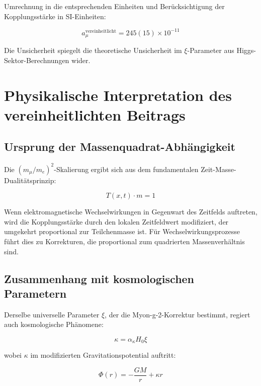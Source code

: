 \documentclass[12pt,a4paper]{article}
\newcommand{\Tfieldt}{T(x,t)}
\newcommand{\xipar}{\xi}
\begin{document}
	Umrechnung in die entsprechenden Einheiten und Berücksichtigung der Kopplungsstärke in SI-Einheiten:
	
	\begin{equation}
		a_\mu^{\text{vereinheitlicht}} = 245(15) \times 10^{-11}
	\end{equation}
	
	Die Unsicherheit spiegelt die theoretische Unsicherheit im $\xipar$-Parameter aus Higgs-Sektor-Berechnungen wider.
	
	\section{Physikalische Interpretation des vereinheitlichten Beitrags}
	
	\subsection{Ursprung der Massenquadrat-Abhängigkeit}
	\label{subsec:mass_squared_dependence}
	
	Die $(m_\mu/m_e)^2$-Skalierung ergibt sich aus dem fundamentalen Zeit-Masse-Dualitätsprinzip:
	
	\begin{equation}
		\Tfieldt \cdot m = 1
	\end{equation}
	
	Wenn elektromagnetische Wechselwirkungen in Gegenwart des Zeitfelds auftreten, wird die Kopplungsstärke durch den lokalen Zeitfeldwert modifiziert, der umgekehrt proportional zur Teilchenmasse ist. Für Wechselwirkungsprozesse führt dies zu Korrekturen, die proportional zum quadrierten Massenverhältnis sind.
	
	\subsection{Zusammenhang mit kosmologischen Parametern}
	\label{subsec:cosmological_connection}
	
	Derselbe universelle Parameter $\xipar$, der die Myon-g-2-Korrektur bestimmt, regiert auch kosmologische Phänomene:
	
	\begin{equation}
		\kappa = \alpha_\kappa H_0 \xipar
	\end{equation}
	
	wobei $\kappa$ im modifizierten Gravitationspotential auftritt:
	
	\begin{equation}
		\Phi(r) = -\frac{GM}{r} + \kappa r
	\end{equation}
	
\end{document}
